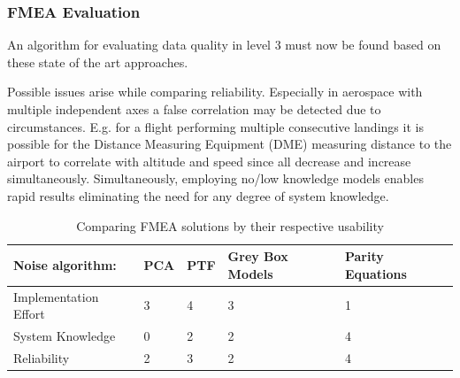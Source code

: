 




\subsubsection{FMEA Evaluation}

An algorithm for evaluating data quality in level 3 must now be found based on these state of the art approaches.

Possible issues arise while comparing reliability. Especially in aerospace with multiple independent axes a false correlation may be detected due to circumstances. E.g. for a flight performing multiple consecutive landings it is possible for the Distance Measuring Equipment (DME) measuring distance to the airport to correlate with altitude and speed since all decrease and increase simultaneously. Simultaneously, employing no/low knowledge models enables rapid results eliminating the need for any degree of system knowledge.


\begin{table}[]
    \begin{tabular}{@{}lllll@{}}
        \toprule
        Noise algorithm:      & PCA & PTF & Grey Box Models & Parity Equations \\ \midrule
        Implementation Effort & 3   & 4   & 3               & 1                \\
        System Knowledge      & 0   & 2   & 2               & 4                \\
        Reliability           & 2   & 3   & 2               & 4                \\ \bottomrule
    \end{tabular}
    \caption{Comparing FMEA solutions by their respective usability}
    \label{tab:lvl3_fmea_comparison}
\end{table}

